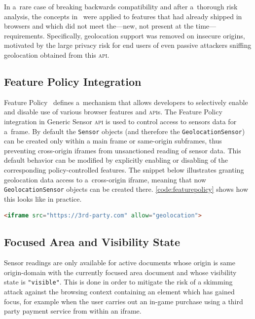 \documentclass[sigconf,hyphens]{acmart}
\begin{document}
In a~rare case of breaking backwards compatibility and after a~thorough risk analysis,
the concepts in~\cite{west2016securecontexts} were applied
to features that had already shipped in browsers
and which did not meet the---new, not present at the time---requirements.
Specifically, geolocation support was removed on insecure origins,
motivated by the large privacy risk for end users of even passive attackers
sniffing geolocation obtained from this \textsc{api}.

\subsection{Feature Policy Integration}

Feature Policy~\cite{clelland2019featurepolicy} defines a~mechanism that allows developers
to selectively enable and disable use of various browser features and \textsc{api}s.
The Feature Policy integration in Generic Sensor \textsc{api}
is used to control access to sensors data for a~frame.
By default the \texttt{Sensor} objects (and therefore the \texttt{GeolocationSensor})
can be created only within a main frame or same-origin subframes,
thus preventing cross-origin iframes from unsanctioned reading of sensor data.
This default behavior can be modified by explicitly enabling or disabling
of the corresponding policy-controlled features.
The snippet below illustrates granting geolocation data access to a~cross-origin iframe,
meaning that now \texttt{GeolocationSensor} objects can be created there.
\autoref{code:featurepolicy} shows how this looks like in practice.

\begin{lstlisting}[caption={Allowing an iframe to use \texttt{GeolocationSensor}},
  label=code:featurepolicy, language=HTML, float=h] 
<iframe src="https://3rd-party.com" allow="geolocation">
\end{lstlisting}

\subsection{Focused Area and Visibility State}
\label{sec:focusandvisibility}

Sensor readings are only available for active documents whose origin is same origin-domain
with the currently focused area document and whose visibility state is \texttt{"visible"}.
This is done in order to mitigate the risk of a skimming attack
against the browsing context containing an element which has gained focus,
for example when the user carries out an in-game purchase using a third party payment service
from within an iframe.
\end{document}
